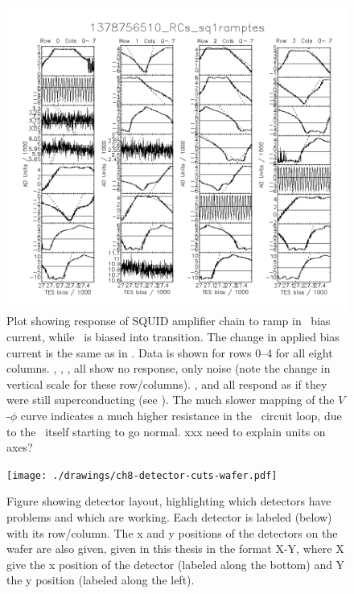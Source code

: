 \begin{figure}[th]
\centering
\includegraphics[width=\textwidth]{./images/1378756510_RCs_sq1ramptes_00.png}
\caption{Plot showing response of SQUID amplifier chain to ramp in \TES\ bias current, while \TES\ is biased into transition. The change in applied bias current is the same as in .
Data is shown for rows 0--4 for all eight columns.
, , ,  all show no response, only noise (note the change in vertical scale for these row/columns).
,  and  all respond as if they were still superconducting (see ).
The much slower mapping of the $V$-$\phi$ curve indicates a much higher resistance in the \TES\ circuit loop, due to the \TES\ itself starting to go normal.
xxx need to explain units on axes?}
\label{fig:tes-bias-ramp-trans}
\end{figure}

\begin{figure}
\centering
\texttt{[image: ./drawings/ch8-detector-cuts-wafer.pdf]}
\caption{
Figure showing detector layout, highlighting which detectors have problems and which are working.
Each detector is labeled (below) with its row/column.
The x and y positions of the detectors on the wafer are also given, given in this thesis in the format X-Y, where X give the x position of the detector (labeled along the bottom) and Y the y position (labeled along the left).
}
\label{fig:detector-cuts-wafer}
\end{figure}

